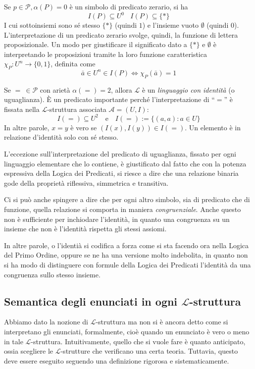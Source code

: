 \begin{oss}
Se $p \in \mathscr{P}, \alpha(P) = 0$ è un simbolo di predicato zerario, si ha 
$$
I(P) \subseteq U^0 ~~~~ I(P) \subseteq \{*\}
$$
I cui sottoinsiemi sono sé stesso $\{*\}$ (quindi $1$) e l'insieme vuoto $\emptyset$ (quindi $0$). \\
L'interpretazione di un predicato zerario svolge, quindi, la funzione di lettera proposizionale. Un modo per giustificare il significato dato a $\{*\}$ e $\emptyset$ è interpretando le proposizioni tramite la loro funzione caratteristica $\chi_P: U^n \rightarrow \{0,1\}$, definita come 
$$
\bar{a} \in U^n \in I(P) \iff \chi_P(\bar{a}) = 1
$$
\end{oss}

\begin{oss}
Se $=\ \in \mathscr{P}$ con arietà $\alpha(=) = 2$, allora $\mathscr{L}$ è un \textit{linguaggio con identità} (o uguaglianza). È un predicato importante perché l'interpretazione di ``$=$'' è fissata nella $\mathscr{L}$-struttura associata $\mathscr{A}=(U,I)$:
$$
I(=) \subseteq U^2 ~~~ \text{ e } ~~~ I(=):= \{(a,a) : a \in U\}
$$
In altre parole, $x = y$ è vero se $(I(x), I(y)) \in I(=)$. Un elemento è in relazione d'identità solo con sé stesso.
\end{oss}

L'eccezione sull'interpretazione del predicato di uguaglianza, fissato per 
ogni linguaggio elementare che lo contiene, è giustificato dal fatto che con 
la potenza espressiva della Logica dei Predicati, si riesce a dire che una 
relazione binaria gode della proprietà riflessiva, simmetrica e transitiva.  

Ci si può anche spingere a dire che per ogni altro simbolo, sia di predicato 
che di funzione, quella relazione si comporta in maniera \textit{congruenziale}. 
Anche questo non è sufficiente per inchiodare l'identità, in quanto una congruenza 
su un insieme che non è l'identità rispetta gli stessi assiomi. 

In altre parole, o l'identià si codifica a forza come si sta facendo ora nella Logica del Primo Ordine, oppure se ne ha una versione molto indebolita, in quanto non si ha modo di distinguere con formule della Logica dei Predicati l'identità da una congruenza sullo stesso insieme.  

\subsection{Semantica degli enunciati in ogni $\mathscr{L}$-struttura}
Abbiamo dato la nozione di $\mathscr{L}$-struttura ma non si è ancora detto 
come si interpretano gli enunciati, formalmente, cioè quando un 
enunciato è vero o meno in tale $\mathscr{L}$-struttura. Intuitivamente, quello che 
si vuole fare è quanto anticipato, ossia scegliere le $\mathscr{L}$-strutture che 
verificano una certa teoria. Tuttavia, questo deve essere eseguito 
seguendo una definizione rigorosa e sistematicamente.

